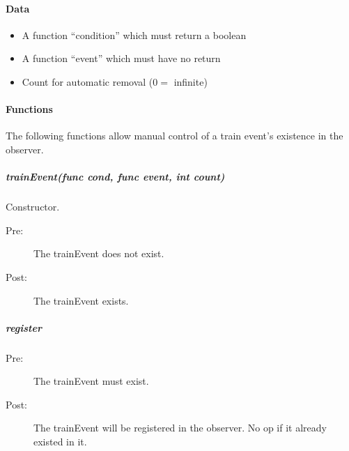 \documentclass[a4paper,11pt,notitlepage]{article}
\begin{document}
\paragraph{Data}
\begin{itemize}
\item A function ``condition'' which must return a boolean
\item A function ``event'' which must have no return
\item Count for automatic removal ($0 =$ infinite)
\end{itemize}
\paragraph{Functions}
The following functions allow manual control of a train event's existence in the observer.
\subparagraph{trainEvent(func cond, func event, int count)} Constructor.
\begin{description}
\item[\hspace{1cm}Pre:] The trainEvent does not exist.
\item[\hspace{1cm}Post:] The trainEvent exists.
\end{description}
\subparagraph{register}
\begin{description}
\item[\hspace{1cm}Pre:] The trainEvent must exist.
\item[\hspace{1cm}Post:] The trainEvent will be registered in the observer. No op if it already existed in it.
\end{description}
\end{document}
